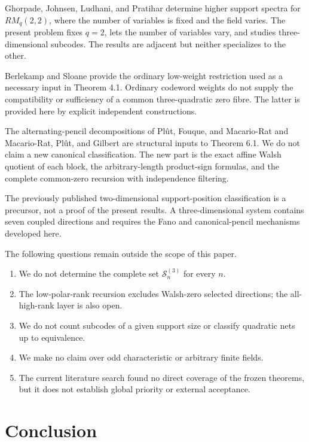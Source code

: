 \documentclass[11pt]{article}
\theoremstyle{remark}
\numberwithin{equation}{section}
\begin{document}
Ghorpade, Johnsen, Ludhani, and Pratihar \cite{ghorpade2026} determine higher support spectra for
\(RM_q(2,2)\), where the number of variables is fixed and the field varies. The
present problem fixes \(q=2\), lets the number of variables vary, and studies
three-dimensional subcodes. The results are adjacent but neither specializes
to the other.

Berlekamp and Sloane \cite{berlekamp1969} provide the ordinary low-weight restriction used as a
necessary input in Theorem 4.1. Ordinary codeword weights do not supply the
compatibility or sufficiency of a common three-quadratic zero fibre. The latter
is provided here by explicit independent constructions.

The alternating-pencil decompositions of Plût, Fouque, and Macario-Rat \cite{plut2015} and
Macario-Rat, Plût, and Gilbert \cite{macariorat2013} are structural inputs to Theorem 6.1. We do
not claim a new canonical classification. The new part is the exact affine
Walsh quotient of each block, the arbitrary-length product-sign formulas, and
the complete common-zero recursion with independence filtering.

The previously published two-dimensional support-position classification \cite{carptopus2026}
is a precursor, not a proof of the present results. A three-dimensional system
contains seven coupled directions and requires the Fano and canonical-pencil
mechanisms developed here.

The following questions remain outside the scope of this paper.

\begin{enumerate}
\item We do not determine the complete set \(\mathcal S_n^{(3)}\) for every \(n\).
\item The low-polar-rank recursion excludes Walsh-zero selected directions; the
all-high-rank layer is also open.
\item We do not count subcodes of a given support size or classify quadratic nets
up to equivalence.
\item We make no claim over odd characteristic or arbitrary finite fields.
\item The current literature search found no direct coverage of the frozen
theorems, but it does not establish global priority or external acceptance.
\end{enumerate}


\section{Conclusion}
\end{document}

